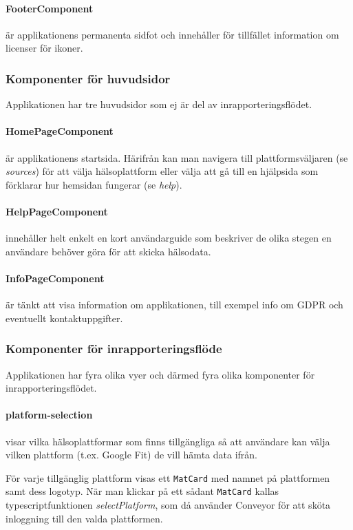 \documentclass[techdoc/techdock.tex]{subfiles}
\begin{document}
\paragraph{FooterComponent}
är applikationens permanenta sidfot och innehåller för tillfället information
om licenser för ikoner.

\subsubsection{Komponenter för huvudsidor}
Applikationen har tre huvudsidor som ej är del av inrapporteringsflödet.

\paragraph{HomePageComponent}
är applikationens startsida. Härifrån kan man navigera till plattformsväljaren
(se \textit{sources}) för att välja hälsoplattform eller välja att gå till en
hjälpsida som förklarar hur hemsidan fungerar (se \textit{help}).

\paragraph{HelpPageComponent}
innehåller helt enkelt en kort användarguide som beskriver de olika stegen
en användare behöver göra för att skicka hälsodata.

\paragraph{InfoPageComponent}
är tänkt att visa information om applikationen, till exempel info om GDPR och
eventuellt kontaktuppgifter.

\subsubsection{Komponenter för inrapporteringsflöde}
Applikationen har fyra olika vyer och därmed fyra olika komponenter för
inrapporteringsflödet.

\paragraph{platform-selection}
visar vilka hälsoplattformar som finns tillgängliga så att användare kan välja
vilken plattform (t.ex. Google Fit) de vill hämta data ifrån.

För varje tillgänglig plattform visas ett \texttt{MatCard} med namnet på
plattformen samt dess logotyp. När man klickar på ett sådant \texttt{MatCard}
kallas typescriptfunktionen \textit{selectPlatform}, som då använder Conveyor
för att sköta inloggning till den valda plattformen.
\end{document}

